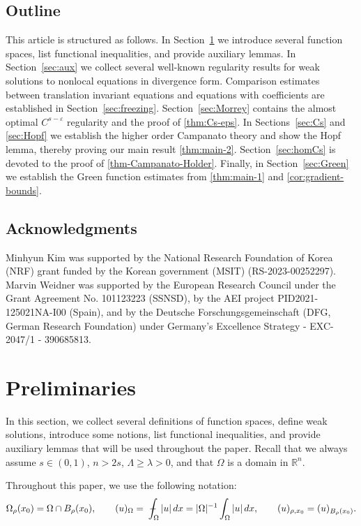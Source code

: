 \documentclass[11pt,reqno]{amsart}
\theoremstyle{plain}
\theoremstyle{definition}
\numberwithin{equation}{section}
\newcommand{\R}{\mathbb{R}}
\newcommand{\eps}{\varepsilon}
\newcommand{\1}{\mathbbm{1}}
\renewcommand{\d}{\textnormal{\,d}}
\newcommand{\average}{{\mathchoice {\kern1ex\vcenter{\hrule height.4pt
width 6pt depth0pt} \kern-9.7pt} {\kern1ex\vcenter{\hrule
height.4pt width 4.3pt depth0pt} \kern-7pt} {} {} }}
\newcommand{\dashint}{\average\int}
\begin{document}
\subsection{Outline}
This article is structured as follows. In Section~\ref{sec:prelim} we introduce several function spaces, list functional inequalities, and provide auxiliary lemmas. In Section~\ref{sec:aux} we collect several well-known regularity results for weak solutions to nonlocal equations in divergence form. Comparison estimates between translation invariant equations and equations with coefficients are established in Section~\ref{sec:freezing}. Section~\ref{sec:Morrey} contains the almost optimal $C^{s-\eps}$ regularity and the proof of \autoref{thm:Cs-eps}. In Sections~\ref{sec:Cs} and \ref{sec:Hopf} we establish the higher order Campanato theory and show the Hopf lemma, thereby proving our main result \autoref{thm:main-2}. Section~\ref{sec:homCs} is devoted to the proof of \autoref{thm-Campanato-Holder}. Finally, in Section~\ref{sec:Green} we establish the Green function estimates from \autoref{thm:main-1} and \autoref{cor:gradient-bounds}.


\subsection{Acknowledgments}

Minhyun Kim was supported by the National Research Foundation of Korea (NRF) grant funded by the Korean government (MSIT) (RS-2023-00252297). Marvin Weidner was supported by the European Research Council under the Grant Agreement No. 101123223 (SSNSD), by the AEI project PID2021-125021NA-I00 (Spain), and by the Deutsche Forschungsgemeinschaft (DFG, German Research Foundation) under Germany's Excellence Strategy - EXC-2047/1 - 390685813.




\section{Preliminaries}
\label{sec:prelim}

In this section, we collect several definitions of function spaces, define weak solutions, introduce some notions, list functional inequalities, and provide auxiliary lemmas that will be used throughout the paper. Recall that we always assume  $s \in (0,1)$, $n>2s$, $\Lambda \geq \lambda >0$, and that $\Omega$ is a domain in $\R^n$.

Throughout this paper, we use the following notation:
\begin{align*}
    \Omega_\rho(x_0) = \Omega \cap B_\rho(x_0), \qquad (u)_\Omega = \dashint_{\Omega} |u| \d x = |\Omega|^{-1} \int_\Omega |u| \d x, \qquad (u)_{\rho,x_0} = (u)_{B_{\rho}(x_0)}.
\end{align*}
\end{document}
